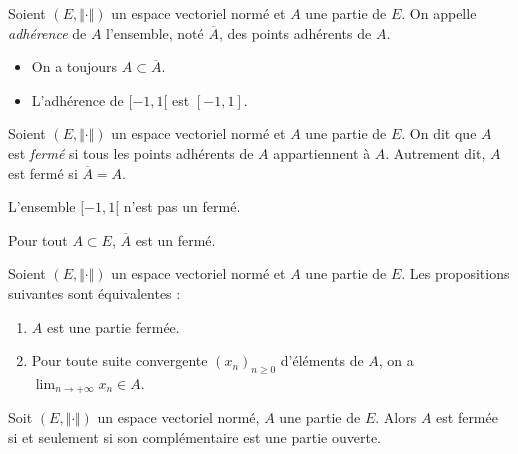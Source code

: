 \documentclass[a4paper,10pt]{report}
\begin{document}
\begin{Definition}{} Soient $(E, \Vert \cdot \Vert)$ un espace vectoriel normé et $A$ une partie de $E$. On appelle \emph{adhérence} de $A$ l'ensemble, noté $\overline{A}$, des points adhérents de $A$.
\end{Definition}

\begin{Remarques}{}
\begin{itemize}
\item On a toujours $A \subset \overline{A}$.
\item L'adhérence de $[-1,1[$ est $[-1,1]$.
\end{itemize}
\end{Remarques}{}

\begin{Definition}{} Soient $(E, \Vert \cdot \Vert)$ un espace vectoriel normé et $A$ une partie de $E$. On dit que $A$ est \emph{fermé} si tous les points adhérents de $A$ appartiennent à $A$. Autrement dit, $A$ est fermé si $\overline{A}=A$.
\end{Definition}

\begin{exems}
\item L'ensemble $[-1,1[$ n'est pas un fermé.
\item Pour tout $A \subset E$, $\overline{A}$ est un fermé.
\end{exems}

\begin{Proposition}{} Soient $(E, \Vert \cdot \Vert)$ un espace vectoriel normé et $A$ une partie de $E$. Les propositions suivantes sont équivalentes :
\begin{enumerate}
\item $A$ est une partie fermée.
\item Pour toute suite convergente $(x_n)_{n \geq 0}$ d'éléments de $A$, on a $\lim_{n \rightarrow + \infty} x_n \in A$.
\end{enumerate}
\end{Proposition}


\begin{Proposition}{} Soit $(E, \Vert \cdot \Vert)$ un espace vectoriel normé, $A$ une partie de $E$. Alors $A$ est fermée si et seulement si son complémentaire est une partie ouverte.
\end{Proposition}
\end{document}
